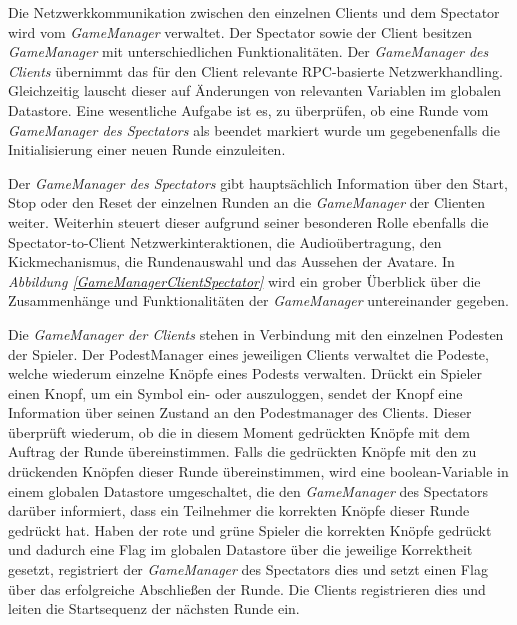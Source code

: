 \documentclass[a4paper,11pt]{article}%
\renewcommand{\\}{\vspace*{0.5\baselineskip} \newline}
\begin{document}
Die Netzwerkkommunikation zwischen den einzelnen Clients und dem Spectator wird vom \textit{GameManager} verwaltet. Der Spectator sowie der Client besitzen \textit{GameManager} mit unterschiedlichen Funktionalitäten. Der \textit{GameManager des Clients} übernimmt das für den Client relevante RPC-basierte Netzwerkhandling. Gleichzeitig lauscht dieser auf Änderungen von relevanten Variablen im globalen Datastore. Eine wesentliche Aufgabe ist es, zu überprüfen, ob eine Runde vom \textit{GameManager des Spectators} als beendet markiert wurde um gegebenenfalls die Initialisierung einer neuen Runde einzuleiten.

Der \textit{GameManager des Spectators} gibt hauptsächlich Information über den Start, Stop oder den Reset der einzelnen Runden an die \textit{GameManager} der Clienten weiter. Weiterhin steuert dieser aufgrund seiner besonderen Rolle ebenfalls die Spectator-to-Client Netzwerkinteraktionen, die Audioübertragung, den Kickmechanismus, die Rundenauswahl und das Aussehen der Avatare.
In \textit{Abbildung \ref{GameManagerClientSpectator}} wird ein grober Überblick über die Zusammenhänge und Funktionalitäten der \textit{GameManager} untereinander gegeben.

Die \textit{GameManager der Clients} stehen in Verbindung mit den einzelnen Podesten der Spieler. Der PodestManager eines jeweiligen Clients verwaltet die Podeste, welche wiederum einzelne Knöpfe eines Podests verwalten. 
Drückt ein Spieler einen Knopf, um ein Symbol ein- oder auszuloggen, sendet der Knopf eine Information über seinen Zustand an den Podestmanager des Clients. Dieser überprüft wiederum, ob die in diesem Moment gedrückten Knöpfe mit dem Auftrag der Runde übereinstimmen. Falls die gedrückten Knöpfe mit den zu drückenden Knöpfen dieser Runde übereinstimmen, wird eine boolean-Variable in einem globalen Datastore umgeschaltet, die den \textit{GameManager} des Spectators darüber informiert, dass ein Teilnehmer die korrekten Knöpfe dieser Runde gedrückt hat. Haben der rote und grüne Spieler die korrekten Knöpfe gedrückt und dadurch eine Flag im globalen Datastore über die jeweilige Korrektheit gesetzt, registriert der \textit{GameManager} des Spectators dies und setzt einen Flag über das erfolgreiche Abschließen der Runde. Die Clients registrieren dies und leiten die Startsequenz der nächsten Runde ein. 
\end{document}
